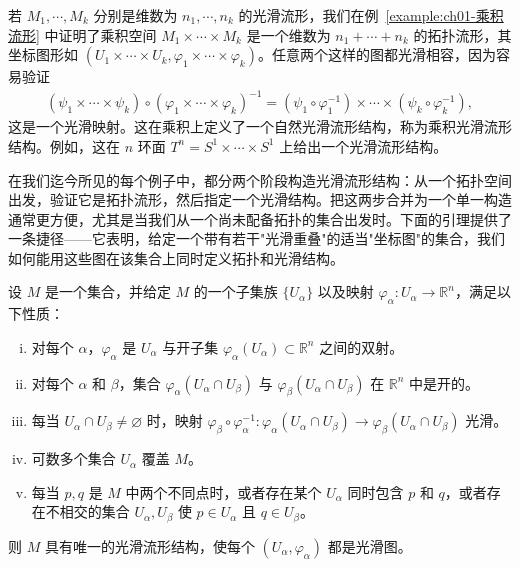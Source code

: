 \documentclass[../../main.tex]{subfiles}
\begin{document}
\begin{example}[光滑乘积流形]\label{example:ch01-光滑乘积流形}
若 $M_{1},\cdots ,M_{k}$ 分别是维数为 $n_{1},\cdots ,n_{k}$ 的光滑流形，我们在例~\cref{example:ch01-乘积流形} 中证明了乘积空间 $M_{1}\times\cdots\times M_{k}$ 是一个维数为 $n_{1}+\cdots+n_{k}$ 的拓扑流形，其坐标图形如 $(U_{1}\times\cdots\times U_{k},\varphi_{1}\times\cdots\times\varphi_{k})$。任意两个这样的图都光滑相容，因为容易验证
\begin{align*}
(\psi_{1}\times\cdots\times\psi_{k})\circ(\varphi_{1}\times\cdots\times\varphi_{k})^{-1}
=(\psi_{1}\circ\varphi_{1}^{-1})\times\cdots\times(\psi_{k}\circ\varphi_{k}^{-1}),
\end{align*}
这是一个光滑映射。这在乘积上定义了一个自然光滑流形结构，称为乘积光滑流形结构。例如，这在 $n$ 环面 $T^{n}=S^{1}\times\cdots\times S^{1}$ 上给出一个光滑流形结构。
\end{example}

在我们迄今所见的每个例子中，都分两个阶段构造光滑流形结构：从一个拓扑空间出发，验证它是拓扑流形，然后指定一个光滑结构。把这两步合并为一个单一构造通常更方便，尤其是当我们从一个尚未配备拓扑的集合出发时。下面的引理提供了一条捷径——它表明，给定一个带有若干"光滑重叠"的适当"坐标图"的集合，我们如何能用这些图在该集合上同时定义拓扑和光滑结构。

\begin{lemma}[光滑流形坐标图引理]\label{lemma:ch01-光滑流形坐标图引理}
设 $M$ 是一个集合，并给定 $M$ 的一个子集族 $\{U_{\alpha}\}$ 以及映射 $\varphi_{\alpha}:U_{\alpha}\to\mathbb{R}^{n}$，满足以下性质：
\begin{enumerate}[(i)]
\item 对每个 $\alpha$，$\varphi_{\alpha}$ 是 $U_{\alpha}$ 与开子集 $\varphi_{\alpha}(U_{\alpha})\subset\mathbb{R}^{n}$ 之间的双射。
\item 对每个 $\alpha$ 和 $\beta$，集合 $\varphi_{\alpha}(U_{\alpha}\cap U_{\beta})$ 与 $\varphi_{\beta}(U_{\alpha}\cap U_{\beta})$ 在 $\mathbb{R}^{n}$ 中是开的。
\item 每当 $U_{\alpha}\cap U_{\beta}\neq\varnothing$ 时，映射 $\varphi_{\beta}\circ\varphi_{\alpha}^{-1}:\varphi_{\alpha}(U_{\alpha}\cap U_{\beta})\to\varphi_{\beta}(U_{\alpha}\cap U_{\beta})$ 光滑。
\item 可数多个集合 $U_{\alpha}$ 覆盖 $M$。
\item 每当 $p,q$ 是 $M$ 中两个不同点时，或者存在某个 $U_{\alpha}$ 同时包含 $p$ 和 $q$，或者存在不相交的集合 $U_{\alpha},U_{\beta}$ 使 $p\in U_{\alpha}$ 且 $q\in U_{\beta}$。
\end{enumerate}
则 $M$ 具有唯一的光滑流形结构，使每个 $(U_{\alpha},\varphi_{\alpha})$ 都是光滑图。
\end{lemma}
\end{document}
